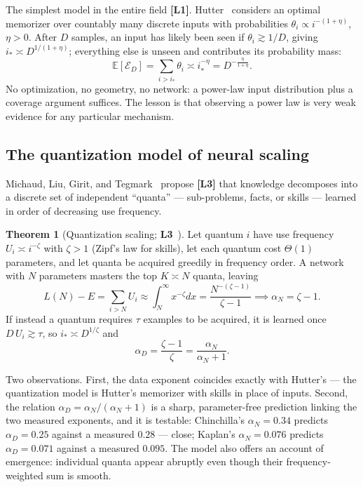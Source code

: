 \documentclass[11pt,a4paper]{article}
\theoremstyle{definition}
\newtheorem{theorem}{Theorem}[section]
\begin{document}
The simplest model in the entire field \textbf{[L1]}. Hutter~\cite{hutter2021learning} considers an optimal memorizer over countably many discrete inputs with probabilities $\theta_i \propto i^{-(1+\eta)}$, $\eta>0$. After $D$ samples, an input has likely been seen if $\theta_i \gtrsim 1/D$, giving $i_*\asymp D^{1/(1+\eta)}$; everything else is unseen and contributes its probability mass:
\begin{equation}
  \mathbb{E}[\mathcal{E}_D] = \sum_{i>i_*}\theta_i \asymp i_*^{-\eta} = \boxed{D^{-\frac{\eta}{1+\eta}}} .
\end{equation}
No optimization, no geometry, no network: a power-law input distribution plus a coverage argument suffices. The lesson is that observing a power law is very weak evidence for any particular mechanism.

\subsection{The quantization model of neural scaling}
\label{subsec:quanta}

Michaud, Liu, Girit, and Tegmark~\cite{michaud2023quantization} propose \textbf{[L3]} that knowledge decomposes into a discrete set of independent ``quanta'' --- sub-problems, facts, or skills --- learned in order of decreasing use frequency.

\begin{theorem}[Quantization scaling; \textbf{L3}~\cite{michaud2023quantization}]
Let quantum $i$ have use frequency $U_i\asymp i^{-\zeta}$ with $\zeta>1$ (Zipf's law for skills), let each quantum cost $\Theta(1)$ parameters, and let quanta be acquired greedily in frequency order. A network with $N$ parameters masters the top $K\asymp N$ quanta, leaving
\begin{equation}
  L(N)-E = \sum_{i>N} U_i \approx \int_N^\infty x^{-\zeta}dx = \frac{N^{-(\zeta-1)}}{\zeta-1}
  \implies \boxed{\alpha_N = \zeta-1} .
\end{equation}
If instead a quantum requires $\tau$ examples to be acquired, it is learned once $D\,U_i\gtrsim\tau$, so $i_*\asymp D^{1/\zeta}$ and
\begin{equation}
  \boxed{\alpha_D = \frac{\zeta-1}{\zeta} = \frac{\alpha_N}{\alpha_N+1}} .
\end{equation}
\end{theorem}

Two observations. First, the data exponent coincides exactly with Hutter's --- the quantization model is Hutter's memorizer with skills in place of inputs. Second, the relation $\alpha_D = \alpha_N/(\alpha_N+1)$ is a sharp, parameter-free prediction linking the two measured exponents, and it is testable: Chinchilla's $\alpha_N=0.34$ predicts $\alpha_D=0.25$ against a measured $0.28$ --- close; Kaplan's $\alpha_N=0.076$ predicts $\alpha_D=0.071$ against a measured $0.095$. The model also offers an account of emergence: individual quanta appear abruptly even though their frequency-weighted sum is smooth.
\end{document}
